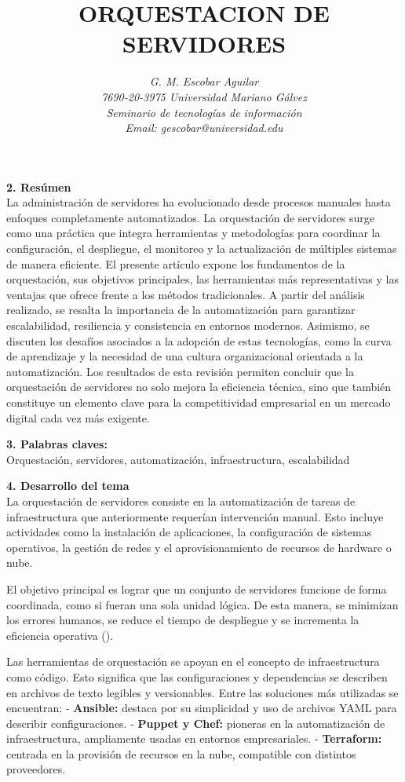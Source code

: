 \documentclass[12pt]{article}
\title{\textbf{\MakeUppercase{ORQUESTACION DE SERVIDORES}}}
\author{\textit{G. M. Escobar Aguilar}\\
\textit{7690-20-3975 Universidad Mariano Gálvez}\\
\textit{Seminario de tecnologías de información}\\
\textit{Email: gescobar@universidad.edu}}
\date{}
\begin{document}
\maketitle

\textbf{2. Resúmen}  
\\
La administración de servidores ha evolucionado desde procesos manuales hasta enfoques completamente automatizados. La orquestación de servidores surge como una práctica que integra herramientas y metodologías para coordinar la configuración, el despliegue, el monitoreo y la actualización de múltiples sistemas de manera eficiente. El presente artículo expone los fundamentos de la orquestación, sus objetivos principales, las herramientas más representativas y las ventajas que ofrece frente a los métodos tradicionales. A partir del análisis realizado, se resalta la importancia de la automatización para garantizar escalabilidad, resiliencia y consistencia en entornos modernos. Asimismo, se discuten los desafíos asociados a la adopción de estas tecnologías, como la curva de aprendizaje y la necesidad de una cultura organizacional orientada a la automatización. Los resultados de esta revisión permiten concluir que la orquestación de servidores no solo mejora la eficiencia técnica, sino que también constituye un elemento clave para la competitividad empresarial en un mercado digital cada vez más exigente.

\textbf{3. Palabras claves:} 
\\
Orquestación, servidores, automatización, infraestructura, escalabilidad

\textbf{4. Desarrollo del tema}  
\\
La orquestación de servidores consiste en la automatización de tareas de infraestructura que anteriormente requerían intervención manual. Esto incluye actividades como la instalación de aplicaciones, la configuración de sistemas operativos, la gestión de redes y el aprovisionamiento de recursos de hardware o nube.  

El objetivo principal es lograr que un conjunto de servidores funcione de forma coordinada, como si fueran una sola unidad lógica. De esta manera, se minimizan los errores humanos, se reduce el tiempo de despliegue y se incrementa la eficiencia operativa (\cite{hussain2021}).  

Las herramientas de orquestación se apoyan en el concepto de infraestructura como código. Esto significa que las configuraciones y dependencias se describen en archivos de texto legibles y versionables. Entre las soluciones más utilizadas se encuentran:  
- \textbf{Ansible:} destaca por su simplicidad y uso de archivos YAML para describir configuraciones.  
- \textbf{Puppet y Chef:} pioneras en la automatización de infraestructura, ampliamente usadas en entornos empresariales.  
- \textbf{Terraform:} centrada en la provisión de recursos en la nube, compatible con distintos proveedores.  
\end{document}
